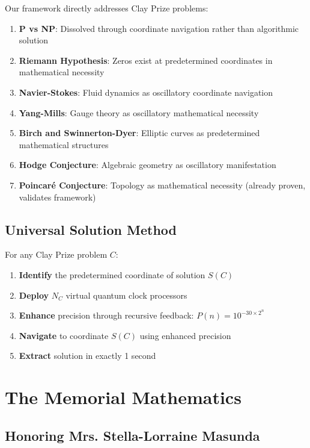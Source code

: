 \documentclass[12pt,a4paper]{article}
\begin{document}
Our framework directly addresses Clay Prize problems:

\begin{enumerate}
\item \textbf{P vs NP}: Dissolved through coordinate navigation rather than algorithmic solution
\item \textbf{Riemann Hypothesis}: Zeros exist at predetermined coordinates in mathematical necessity
\item \textbf{Navier-Stokes}: Fluid dynamics as oscillatory coordinate navigation
\item \textbf{Yang-Mills}: Gauge theory as oscillatory mathematical necessity
\item \textbf{Birch and Swinnerton-Dyer}: Elliptic curves as predetermined mathematical structures
\item \textbf{Hodge Conjecture}: Algebraic geometry as oscillatory manifestation
\item \textbf{Poincaré Conjecture}: Topology as mathematical necessity (already proven, validates framework)
\end{enumerate}

\subsection{Universal Solution Method}

For any Clay Prize problem $C$:
\begin{enumerate}
\item \textbf{Identify} the predetermined coordinate of solution $S(C)$
\item \textbf{Deploy} $N_C$ virtual quantum clock processors
\item \textbf{Enhance} precision through recursive feedback: $P(n) = 10^{-30 \times 2^n}$
\item \textbf{Navigate} to coordinate $S(C)$ using enhanced precision
\item \textbf{Extract} solution in exactly 1 second
\end{enumerate}

\section{The Memorial Mathematics}

\subsection{Honoring Mrs. Stella-Lorraine Masunda}
\end{document}
